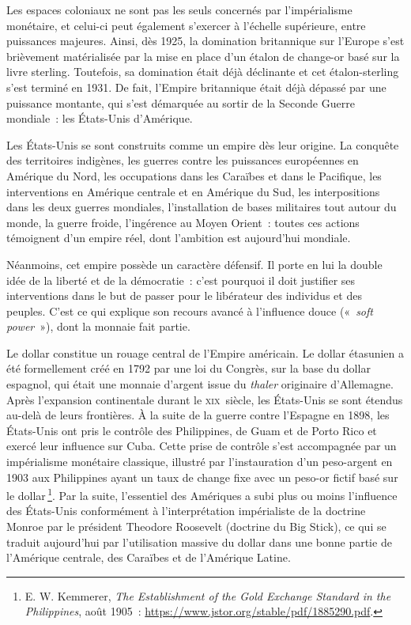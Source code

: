 \documentclass[a4paper,notitlepage]{article}
\newcommand{\eng}[1]{{\NoAutoSpaceBeforeFDP\emph{#1}}}  %
\newcommand{\sfootnote}{\,\footnote}
\begin{document}

Les espaces coloniaux ne sont pas les seuls concernés par l'impérialisme monétaire, et celui-ci peut également s'exercer à l'échelle supérieure, entre puissances majeures. Ainsi, dès 1925, la domination britannique sur l'Europe s'est brièvement matérialisée par la mise en place  d'un étalon de change-or basé sur la livre sterling. Toutefois, sa domination était déjà déclinante et cet étalon-sterling s'est terminé en 1931. De fait, l'Empire britannique était déjà dépassé par une puissance montante, qui s'est démarquée au sortir de la Seconde Guerre mondiale~: les États-Unis d'Amérique.


Les États-Unis se sont construits comme un empire dès leur origine. La conquête des territoires indigènes, les guerres contre les puissances européennes en Amérique du Nord, les occupations dans les Caraïbes et dans le Pacifique, les interventions en Amérique centrale et en Amérique du Sud, les interpositions dans les deux guerres mondiales, l'installation de bases militaires tout autour du monde, la guerre froide, l'ingérence au Moyen Orient~: toutes ces actions témoignent d'un empire réel, dont l'ambition est aujourd'hui mondiale.

Néanmoins, cet empire possède un caractère défensif. Il porte en lui la double idée de la liberté et de la démocratie~: c'est pourquoi il doit justifier ses interventions dans le but de passer pour le libérateur des individus et des peuples. C'est ce qui explique son recours avancé à l'influence douce («~\eng{soft power}~»), dont la monnaie fait partie.  %

Le dollar constitue un rouage central de l'Empire américain. Le dollar étasunien a été formellement créé en 1792 par une loi du Congrès, sur la base du dollar espagnol, qui était une monnaie d'argent issue du \eng{thaler} originaire d'Allemagne. Après l'expansion continentale durant le \textsc{xix}\ieme{}~siècle, les États-Unis se sont étendus au-delà de leurs frontières. À la suite de la guerre contre l'Espagne en 1898, les États-Unis ont pris le contrôle des Philippines, de Guam et de Porto Rico et exercé leur influence sur Cuba. Cette prise de contrôle s'est accompagnée par un impérialisme monétaire classique, illustré par l'instauration d'un peso-argent en 1903 aux Philippines ayant un taux de change fixe avec un peso-or fictif basé sur le dollar\sfootnote{E. W. Kemmerer, \eng{The Establishment of the Gold Exchange Standard in the Philippines}, août 1905~: \url{https://www.jstor.org/stable/pdf/1885290.pdf}.}. Par la suite, l'essentiel des Amériques a subi plus ou moins l'influence des États-Unis conformément à l'interprétation impérialiste de la doctrine Monroe par le président Theodore Roosevelt (doctrine du Big Stick), ce qui se traduit aujourd'hui par l'utilisation massive du dollar dans une bonne partie de l'Amérique centrale, des Caraïbes et de l'Amérique Latine.
\end{document}
